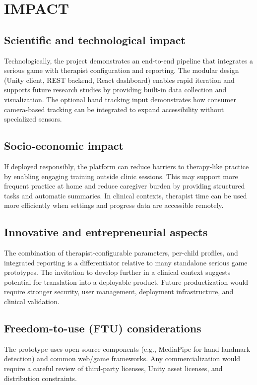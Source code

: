 \documentclass[12pt]{article}
\begin{document}
\clearpage
\section{IMPACT}
\subsection*{Scientific and technological impact}
Technologically, the project demonstrates an end-to-end pipeline that integrates a serious game with therapist configuration and reporting. The modular design (Unity client, REST backend, React dashboard) enables rapid iteration and supports future research studies by providing built-in data collection and visualization. The optional hand tracking input demonstrates how consumer camera-based tracking can be integrated to expand accessibility without specialized sensors.

\subsection*{Socio-economic impact}
If deployed responsibly, the platform can reduce barriers to therapy-like practice by enabling engaging training outside clinic sessions. This may support more frequent practice at home and reduce caregiver burden by providing structured tasks and automatic summaries. In clinical contexts, therapist time can be used more efficiently when settings and progress data are accessible remotely.

\subsection*{Innovative and entrepreneurial aspects}
The combination of therapist-configurable parameters, per-child profiles, and integrated reporting is a differentiator relative to many standalone serious game prototypes. The invitation to develop further in a clinical context suggests potential for translation into a deployable product. Future productization would require stronger security, user management, deployment infrastructure, and clinical validation.

\subsection*{Freedom-to-use (FTU) considerations}
The prototype uses open-source components (e.g., MediaPipe for hand landmark detection) and common web/game frameworks. Any commercialization would require a careful review of third-party licenses, Unity asset licenses, and distribution constraints.
\end{document}

